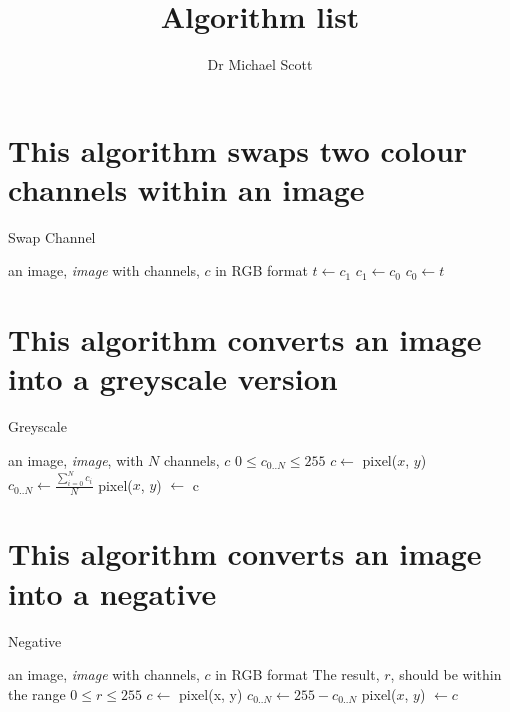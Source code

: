 \documentclass{../../../fal_assignment}
\title{Algorithm list}
\author{Dr Michael Scott}
\begin{document}
	
	\maketitle
	\tableofcontents

	\clearpage	
	\section{This algorithm swaps two colour channels within an image}
	
	\begin{algorithm}[ht]
		\caption{Swap Channel}
		\label{alg:algorithm}
		
		\begin{algorithmic}[1]
			\Require an image, \textit{image} with channels, $c$ in RGB format
			 \State $t \leftarrow c_{1}$
			 \State $c_{1}  \leftarrow c_{0}$
			 \State $c_{0} \leftarrow t$
			\EndFor
			\EndProcedure
		\end{algorithmic}
	\end{algorithm}

	\clearpage
	\section{This algorithm converts an image into a greyscale version}

	\begin{algorithm}[ht]
	\caption{Greyscale}
	\label{alg:algorithm}
	
	\begin{algorithmic}[1]
			\Require 
			\Statex an image, \textit{image}, with $N$ channels, $c$
			\Statex $0 \leq c_{0..N} \leq 255$
			\State $c \leftarrow$ pixel($x$, $y$)
			\State $c_{0..N} \leftarrow \frac{\sum_{i=0}^{N} c_i}{N}$
			\State pixel($x$, $y$) $\leftarrow$ c
			\EndFor
			\EndProcedure
	\end{algorithmic}
	
	\end{algorithm}

	\clearpage
	\section{This algorithm converts an image into a negative}
	
	\begin{algorithm}[ht]
	\caption{Negative}
	\label{alg:algorithm}
	
	\begin{algorithmic}[1]
			\Require
			\Statex an image, \textit{image} with channels, $c$ in RGB format
			\Ensure The result, $r$, should be within the range \Statex $0 \leq r \leq 255$
			\State $c \leftarrow $ pixel(x, y)
			\State $c_{0..N} \leftarrow 255 - c_{0..N}$
			\State pixel($x$, $y$) $\leftarrow c$
			\EndFor
			\EndProcedure
	\end{algorithmic}
	
	\end{algorithm}
\end{document}
